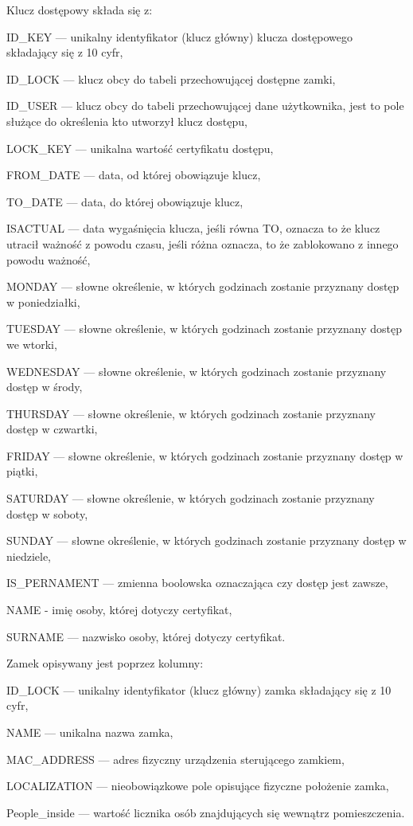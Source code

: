 Klucz dostępowy składa się z:
\begin{itemize*}
	\item {ID\_KEY} --- unikalny identyfikator (klucz główny) klucza dostępowego składający się z 10 cyfr,
	\item {ID\_LOCK} --- klucz obcy do tabeli przechowującej dostępne zamki,
	\item {ID\_USER} --- klucz obcy do tabeli przechowującej dane użytkownika, jest to pole służące do określenia kto utworzył klucz dostępu,
	\item {LOCK\_KEY} --- unikalna wartość certyfikatu dostępu,
	\item {FROM\_DATE} --- data, od której obowiązuje klucz,
	\item {TO\_DATE} --- data, do której obowiązuje klucz,
	\item {ISACTUAL} --- data wygaśnięcia klucza, jeśli równa TO, oznacza to że klucz utracił ważność z powodu czasu, jeśli różna oznacza, to że zablokowano z innego powodu ważność,
	\item {MONDAY} --- słowne określenie, w których godzinach zostanie przyznany dostęp w poniedziałki,
	\item {TUESDAY} --- słowne określenie, w których godzinach zostanie przyznany dostęp we wtorki,
	\item {WEDNESDAY} --- słowne określenie, w których godzinach zostanie przyznany dostęp w środy,
	\item {THURSDAY} --- słowne określenie, w których godzinach zostanie przyznany dostęp w czwartki,
	\item {FRIDAY} --- słowne określenie, w których godzinach zostanie przyznany dostęp w piątki,
	\item {SATURDAY} --- słowne określenie, w których godzinach zostanie przyznany dostęp w soboty,
	\item {SUNDAY} --- słowne określenie, w których godzinach zostanie przyznany dostęp w niedziele,
	\item {IS\_PERNAMENT} --- zmienna boolowska oznaczająca czy dostęp jest zawsze,
	\item {NAME} - imię osoby, której dotyczy certyfikat,
	\item {SURNAME} --- nazwisko osoby, której dotyczy certyfikat.
\end{itemize*}

\newpage
Zamek opisywany jest poprzez kolumny:
\begin{itemize*}
	\item {ID\_LOCK} --- unikalny identyfikator (klucz główny) zamka składający się z 10 cyfr,
	\item {NAME} --- unikalna nazwa zamka,
	\item {MAC\_ADDRESS} --- adres fizyczny urządzenia sterującego zamkiem,
	\item {LOCALIZATION} --- nieobowiązkowe pole opisujące fizyczne położenie zamka,
	\item {People\_inside} --- wartość licznika osób znajdujących się wewnątrz pomieszczenia.
\end{itemize*}

